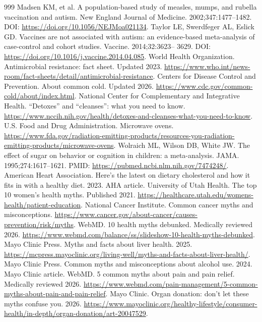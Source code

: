 \documentclass[11pt,oneside]{book}
\begin{document}
\begin{thebibliography}{999}
Madsen KM, et al. A population-based study of measles, mumps, and rubella vaccination and autism. New England Journal of Medicine. 2002;347:1477--1482. DOI: \url{https://doi.org/10.1056/NEJMoa021134}.
Taylor LE, Swerdfeger AL, Eslick GD. Vaccines are not associated with autism: an evidence-based meta-analysis of case-control and cohort studies. Vaccine. 2014;32:3623-- 3629. DOI: \url{https://doi.org/10.1016/j.vaccine.2014.04.085}.
World Health Organization. Antimicrobial resistance: fact sheet. Updated 2023. \url{https://www.who.int/news-room/fact-sheets/detail/antimicrobial-resistance}.
Centers for Disease Control and Prevention. About common cold. Updated 2026. \url{https://www.cdc.gov/common-cold/about/index.html}.
National Center for Complementary and Integrative Health. ``Detoxes'' and ``cleanses'': what you need to know. \url{https://www.nccih.nih.gov/health/detoxes-and-cleanses-what-you-need-to-know}.
U.S. Food and Drug Administration. Microwave ovens. \url{https://www.fda.gov/radiation-emitting-products/resources-you-radiation-emitting-products/microwave-ovens}.
Wolraich ML, Wilson DB, White JW. The effect of sugar on behavior or cognition in children: a meta-analysis. JAMA. 1995;274:1617--1621. PMID: \url{https://pubmed.ncbi.nlm.nih.gov/7474248/}.
American Heart Association. Here's the latest on dietary cholesterol and how it fits in with a healthy diet. 2023. AHA article.
University of Utah Health. The top 10 women's health myths. Published 2021. \url{https://healthcare.utah.edu/womens-health/patient-education}.
National Cancer Institute. Common cancer myths and misconceptions. \url{https://www.cancer.gov/about-cancer/causes-prevention/risk/myths}.
WebMD. 10 health myths debunked. Medically reviewed 2026. \url{https://www.webmd.com/balance/ss/slideshow-10-health-myths-debunked}.
Mayo Clinic Press. Myths and facts about liver health. 2025. \url{https://mcpress.mayoclinic.org/living-well/myths-and-facts-about-liver-health/}.
Mayo Clinic Press. Common myths and misconceptions about alcohol use. 2024. Mayo Clinic article.
WebMD. 5 common myths about pain and pain relief. Medically reviewed 2026. \url{https://www.webmd.com/pain-management/5-common-myths-about-pain-and-pain-relief}.
Mayo Clinic. Organ donation: don't let these myths confuse you. 2026. \url{https://www.mayoclinic.org/healthy-lifestyle/consumer-health/in-depth/organ-donation/art-20047529}.

\end{thebibliography}
\end{document}
